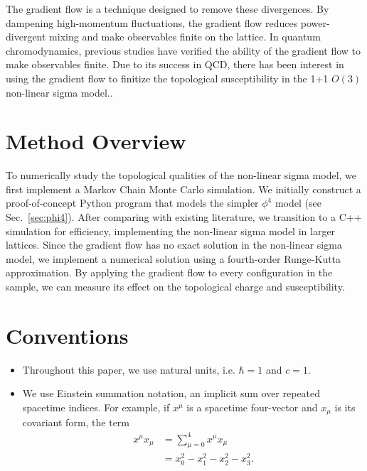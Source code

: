 \documentclass[12pt]{report}
\newcommand{\citeneeded}{}
\begin{document}
The gradient flow is a technique designed to remove these divergences. By dampening high-momentum fluctuations, the gradient flow reduces power-divergent mixing and make observables finite on the lattice.\cite{monahan2016} In quantum chromodynamics, previous studies have verified the ability of the gradient flow to make observables finite\citeneeded. Due to its success in QCD, there has been interest in using the gradient flow to finitize the topological susceptibility in the 1+1 $O(3)$ non-linear sigma model.\cite{bietenholz2018}.


\section{Method Overview}

To numerically study the topological qualities of the non-linear sigma model, we first implement a Markov Chain Monte Carlo simulation. We initially construct a proof-of-concept Python program that models the simpler $\phi^4$ model (see Sec.~\ref{sec:phi4}). After comparing with existing literature, we transition to a C++ simulation for efficiency, implementing the non-linear sigma model in larger lattices. Since the gradient flow has no exact solution in the non-linear sigma model, we implement a numerical solution using a fourth-order Runge-Kutta approximation. By applying the gradient flow to every configuration in the sample, we can measure its effect on the topological charge and susceptibility.


\section{Conventions}
\begin{itemize}
    \item Throughout this paper, we use natural units, i.e. $\hbar = 1$ and $c=1$.
    \item We use Einstein summation notation, an implicit sum over repeated spacetime indices. For example, if $x^\mu$ is a spacetime four-vector and $x_\mu$ is its covariant form, the term
        \begin{align*}
            x^\mu x_\mu &= \sum^4_{\mu=0} x^\mu x_\mu \\
            &= x_0^2-x_1^2-x_2^2-x_3^2.
        \end{align*}
\end{itemize}

\end{document}
